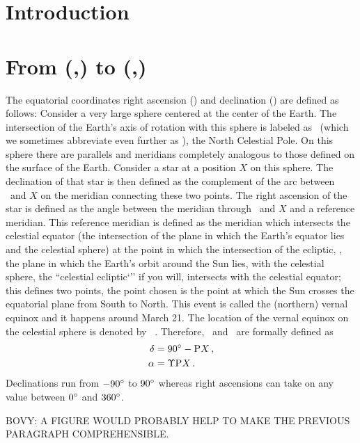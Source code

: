 

\section{Introduction}


\section{From (\ra,\dec) to (\gall,\galb)}

The equatorial coordinates right ascension (\ra) and declination
(\dec) are defined as follows: Consider a very large sphere centered
at the center of the Earth. The intersection of the Earth's axis of
rotation with this sphere is labeled as \ncp\ (which we sometimes
abbreviate even further as \ncpp), the North Celestial Pole. On this
sphere there are parallels and meridians completely analogous to those
defined on the surface of the Earth. Consider a star at a position $X$
on this sphere. The declination of that star is then defined as the
complement of the arc between \ncp\ and $X$ on the meridian connecting
these two points. The right ascension of the star is defined as the
angle between the meridian through \ncp\ and $X$ and a reference
meridian. This reference meridian is defined as the meridian which
intersects the celestial equator (the intersection of the plane in
which the Earth's equator lies and the celestial sphere) at the point
in which the intersection of the ecliptic, \ie, the plane in which the
Earth's orbit around the Sun lies, with the celestial sphere, the
``celestial ecliptic`'' if you will, intersects with the celestial
equator; this defines two points, the point chosen is the point at
which the Sun crosses the equatorial plane from South to North. This
event is called the (northern) vernal equinox and it happens around
March 21. The location of the vernal equinox on the celestial sphere
is denoted by \vernal\ \citep[][pp.14-6]{Green85a}. Therefore,
\ra\ and \dec\ are formally defined as
\begin{align}
\delta &= 90^{\circ} - \textnormal{P} X\, ,\\
\alpha &= \Upsilon \textnormal{P} X \, .
\end{align}
Declinations run from $-90^{\circ}$ to $90^{\circ}$ whereas right
ascensions can take on any value between $0^{\circ}$ and $360^{\circ}$.

BOVY: A FIGURE WOULD PROBABLY HELP TO MAKE THE PREVIOUS PARAGRAPH
COMPREHENSIBLE.


